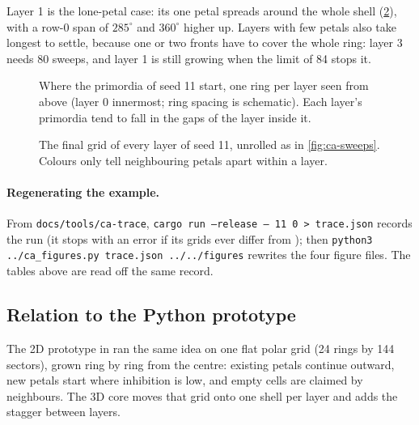 Layer 1 is the lone-petal case: its one petal spreads around the whole shell
(\cref{fig:ca-layers}), with a row-0 span of $285^\circ$ and $360^\circ$
higher up. Layers with few petals also take longest to settle, because one or two
fronts have to cover the whole ring: layer 3 needs 80 sweeps, and layer 1 is
still growing when the limit of 84 stops it.

\begin{figure}[ht]
\centering

\caption{Where the primordia of seed 11 start, one ring per layer seen from
above (layer 0 innermost; ring spacing is schematic). Each layer's
primordia tend to fall in the gaps of the layer inside it.}
\label{fig:ca-rings}
\end{figure}

\begin{figure}[ht]
\centering

\caption{The final grid of every layer of seed 11, unrolled as in
\cref{fig:ca-sweeps}. Colours only tell neighbouring petals apart within a
layer.}
\label{fig:ca-layers}
\end{figure}

\paragraph{Regenerating the example.} From \texttt{docs/tools/ca-trace},
\texttt{cargo run --release -- 11 0 > trace.json} records the run (it
stops with an error if its grids ever differ from ); then
\texttt{python3 ../ca\_figures.py trace.json ../../figures} rewrites the four
figure files. The tables above are read off the same record.

\subsection{Relation to the Python prototype}
The 2D prototype in  ran the same idea on one flat polar
grid (24 rings by 144 sectors), grown ring by ring from the centre: existing
petals continue outward, new petals start where inhibition is low, and empty
cells are claimed by neighbours. The 3D core moves that grid onto one shell per
layer and adds the stagger between layers.
